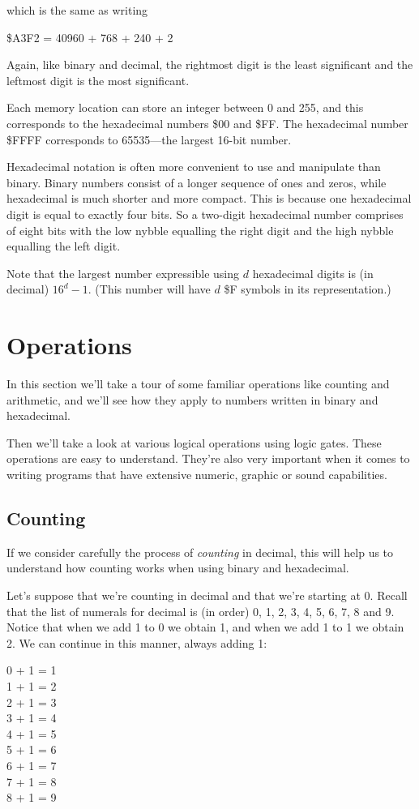 which is the same as writing

\begin{center}
	\$A3F2 = 40960 + 768 + 240 + 2
\end{center}

Again, like binary and decimal, the rightmost digit is the least significant and the leftmost digit is the most significant.

Each memory location can store an integer between 0 and 255, and this corresponds to the hexadecimal numbers \$00 and \$FF. The hexadecimal number \$FFFF corresponds to 65535---the largest 16-bit number.

Hexadecimal notation is often more convenient to use and manipulate than binary. Binary numbers consist of a longer sequence of ones and zeros, while hexadecimal is much shorter and more compact. This is because one hexadecimal digit is equal to exactly four bits. So a two-digit hexadecimal number comprises of eight bits with the low nybble equalling the right digit and the high nybble equalling the left digit.

Note that the largest number expressible using $d$ hexadecimal digits is (in decimal) $16^{d} - 1$. (This number will have $d$ \$F symbols in its representation.)

\section{Operations}
In this section we'll take a tour of some familiar operations like counting and arithmetic, and we'll see how they apply to numbers written in binary and hexadecimal.

Then we'll take a look at various logical operations using logic gates. These operations are easy to understand. They're also very important when it comes to writing programs that have extensive numeric, graphic or sound capabilities.

\subsection{Counting}
If we consider carefully the process of {\it counting} in decimal, this will help us to understand how counting works when using binary and hexadecimal.

Let's suppose that we're counting in decimal and that we're starting at 0. Recall that the list of numerals for decimal is (in order) 0, 1, 2, 3, 4, 5, 6, 7, 8 and 9. Notice that when we add 1 to 0 we obtain 1, and when we add 1 to 1 we obtain 2. We can continue in this manner, always adding 1:
\begin{center}
	0 + 1 = 1  \\
	1 + 1 = 2  \\
	2 + 1 = 3  \\
	3 + 1 = 4  \\
	4 + 1 = 5  \\
	5 + 1 = 6  \\
	6 + 1 = 7  \\
	7 + 1 = 8  \\
	8 + 1 = 9  \\
\end{center}

